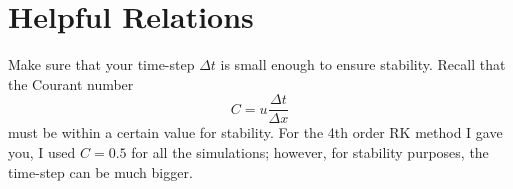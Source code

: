 \documentclass[10pt]{article}
\begin{document}
\section{Helpful Relations}
Make sure that your time-step $\Delta t$ is small enough to ensure stability. Recall that the Courant number
\[
C=u \frac{\Delta t}{\Delta x}
\]
must be within a certain value for stability. 
For the 4th order RK method I gave you, I used $C=0.5$ for all the simulations;
however, for stability purposes, the time-step can be much bigger.
\end{document}
